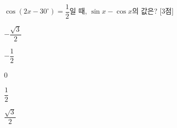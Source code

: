 $\cos(2x-30^\circ)=\dfrac{1}{2}$일 때, $\sin x-\cos x$의 값은?  \mbox{[3점]}
\begin{choices32}{\rule[-3ex]{0pt}{8ex}$-\dfrac{\sqrt{3}}{2}$}{\rule[-3ex]{0pt}{8ex}$-\dfrac{1}{2}$}{\rule[-3ex]{0pt}{8ex}$0$}{\rule[-3ex]{0pt}{8ex}$\dfrac{1}{2}$}{\rule[-3ex]{0pt}{8ex}$\dfrac{\sqrt{3}}{2}$}\end{choices32}
